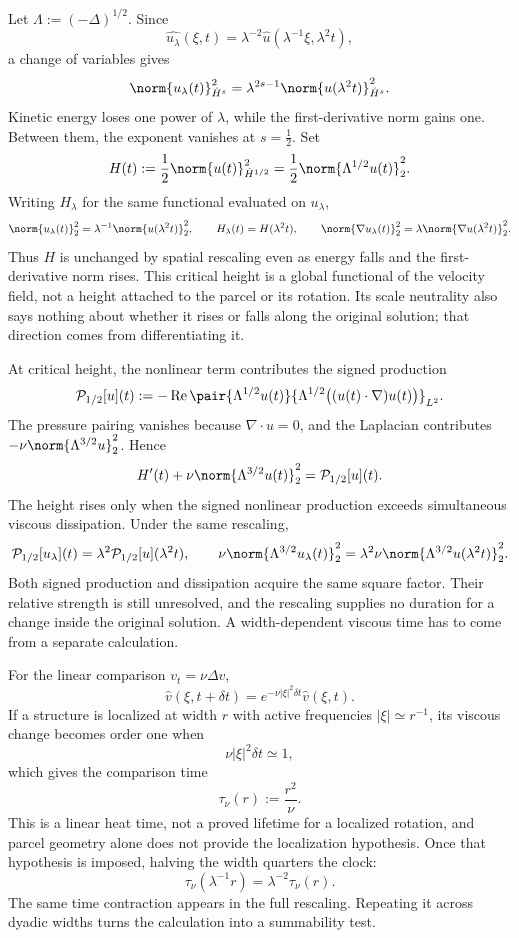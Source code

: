 
Let \(\Lambda:=(-\Delta)^{1/2}\). Since
\[
  \widehat{u_\lambda}(\xi,t)
  =
  \lambda^{-2}\widehat u(\lambda^{-1}\xi,\lambda^2t),
\]
a change of variables gives
\[
  \norm{u_\lambda(t)}_{\dot H^s}^2
  =
  \lambda^{2s-1}
  \norm{u(\lambda^2t)}_{\dot H^s}^2.
\]
Kinetic energy loses one power of \(\lambda\), while the first-derivative norm gains one. Between them, the exponent vanishes at \(s=\tfrac12\). Set
\[
  H(t)
  :=
  \frac12\norm{u(t)}_{\dot H^{1/2}}^2
  =
  \frac12\norm{\Lambda^{1/2}u(t)}_2^2.
\]
Writing \(H_\lambda\) for the same functional evaluated on \(u_\lambda\),
\[
  \norm{u_\lambda(t)}_2^2
  =
  \lambda^{-1}\norm{u(\lambda^2t)}_2^2,
  \qquad
  H_\lambda(t)=H(\lambda^2t),
  \qquad
  \norm{\nabla u_\lambda(t)}_2^2
  =
  \lambda\norm{\nabla u(\lambda^2t)}_2^2.
\]
Thus \(H\) is unchanged by spatial rescaling even as energy falls and the first-derivative norm rises. This critical height is a global functional of the velocity field, not a height attached to the parcel or its rotation. Its scale neutrality also says nothing about whether it rises or falls along the original solution; that direction comes from differentiating it.


At critical height, the nonlinear term contributes the signed production
\[
  \mathcal P_{1/2}[u](t)
  :=
  -\operatorname{Re}
  \pair
    {\Lambda^{1/2}u(t)}
    {\Lambda^{1/2}\bigl((u(t)\cdot\nabla)u(t)\bigr)}_{L^2}.
\]
The pressure pairing vanishes because \(\nabla\cdot u=0\), and the Laplacian contributes \(-\nu\norm{\Lambda^{3/2}u}_2^2\). Hence
\[
  H'(t)
  +
  \nu\norm{\Lambda^{3/2}u(t)}_2^2
  =
  \mathcal P_{1/2}[u](t).
\]
The height rises only when the signed nonlinear production exceeds simultaneous viscous dissipation. Under the same rescaling,
\[
  \mathcal P_{1/2}[u_\lambda](t)
  =
  \lambda^2\mathcal P_{1/2}[u](\lambda^2t),
  \qquad
  \nu\norm{\Lambda^{3/2}u_\lambda(t)}_2^2
  =
  \lambda^2\nu\norm{\Lambda^{3/2}u(\lambda^2t)}_2^2.
\]
Both signed production and dissipation acquire the same square factor. Their relative strength is still unresolved, and the rescaling supplies no duration for a change inside the original solution. A width-dependent viscous time has to come from a separate calculation.


For the linear comparison \(v_t=\nu\Delta v\),
\[
  \widehat v(\xi,t+\delta t)
  =
  e^{-\nu|\xi|^2\delta t}\widehat v(\xi,t).
\]
If a structure is localized at width \(r\) with active frequencies \(|\xi|\simeq r^{-1}\), its viscous change becomes order one when
\[
  \nu|\xi|^2\delta t\simeq1,
\]
which gives the comparison time
\[
  \tau_\nu(r)
  :=
  \frac{r^2}{\nu}.
\]
This is a linear heat time, not a proved lifetime for a localized rotation, and parcel geometry alone does not provide the localization hypothesis. Once that hypothesis is imposed, halving the width quarters the clock:
\[
  \tau_\nu(\lambda^{-1}r)
  =
  \lambda^{-2}\tau_\nu(r).
\]
The same time contraction appears in the full rescaling. Repeating it across dyadic widths turns the calculation into a summability test.

